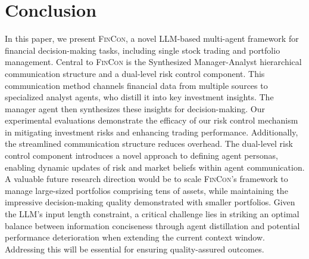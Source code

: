 \documentclass{article}
\begin{document}
\section{Conclusion}
\label{sec:conclusion}
In this paper, we present \textsc{FinCon}, a novel LLM-based multi-agent framework for financial decision-making tasks, including single stock trading and portfolio management. Central to \textsc{FinCon} is the Synthesized Manager-Analyst hierarchical communication structure and a dual-level risk control component. This communication method channels financial data from multiple sources to specialized analyst agents, who distill it into key investment insights. The manager agent then synthesizes these insights for decision-making. Our experimental evaluations demonstrate the efficacy of our risk control mechanism in mitigating investment risks and enhancing trading performance. Additionally, the streamlined communication structure reduces overhead. The dual-level risk control component introduces a novel approach to defining agent personas, enabling dynamic updates of  risk and market beliefs within agent communication. A valuable future research direction would be to scale \textsc{FinCon}'s framework to manage large-sized portfolios comprising tens of assets, while maintaining the impressive decision-making quality demonstrated with smaller portfolios. Given the LLM’s input length constraint, a critical challenge lies in striking an optimal balance between information conciseness through agent distillation and potential performance deterioration when extending the current context window. Addressing this will be essential for ensuring quality-assured outcomes.


\newpage
  
 

\newpage
\appendix





\end{document}
